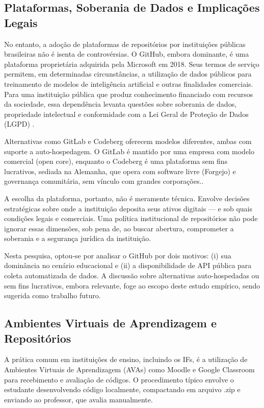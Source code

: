 \documentclass[english, spanish, brazilian]{RBIEarticle}
\begin{document}
\subsection*{Plataformas, Soberania de Dados e Implicações Legais}

No entanto, a adoção de plataformas de repositórios por instituições públicas brasileiras não é isenta de controvérsias. O GitHub, embora dominante, é uma plataforma proprietária adquirida pela Microsoft em 2018. Seus termos de serviço permitem, em determinadas circunstâncias, a utilização de dados públicos para treinamento de modelos de inteligência artificial e outras finalidades comerciais. Para uma instituição pública que produz conhecimento financiado com recursos da sociedade, essa dependência levanta questões sobre soberania de dados, propriedade intelectual e conformidade com a Lei Geral de Proteção de Dados (LGPD) \cite{lgpd2018}.

Alternativas como GitLab e Codeberg oferecem modelos diferentes, ambas com suporte a auto-hospedagem. O GitLab é mantido por uma empresa com modelo comercial (open core), enquanto o Codeberg é uma plataforma sem fins lucrativos, sediada na Alemanha, que opera com software livre (Forgejo) e governança comunitária, sem vínculo com grandes corporações..

A escolha da plataforma, portanto, não é meramente técnica. Envolve decisões estratégicas sobre onde a instituição deposita seus ativos digitais — e sob quais condições legais e comerciais. Uma política institucional de repositórios não pode ignorar essas dimensões, sob pena de, ao buscar abertura, comprometer a soberania e a segurança jurídica da instituição.

Nesta pesquisa, optou-se por analisar o GitHub por dois motivos: (i) sua dominância no cenário educacional e (ii) a disponibilidade de API pública para coleta automatizada de dados. A discussão sobre alternativas auto-hospedadas ou sem fins lucrativos, embora relevante, foge ao escopo deste estudo empírico, sendo sugerida como trabalho futuro.

\subsection{Ambientes Virtuais de Aprendizagem e Repositórios}

A prática comum em instituições de ensino, incluindo os IFs, é a utilização de Ambientes Virtuais de Aprendizagem (AVAs) como Moodle e Google Classroom para recebimento e avaliação de códigos. O procedimento típico envolve o estudante desenvolvendo código localmente, compactando em arquivo .zip e enviando ao professor, que avalia manualmente.
\end{document}
